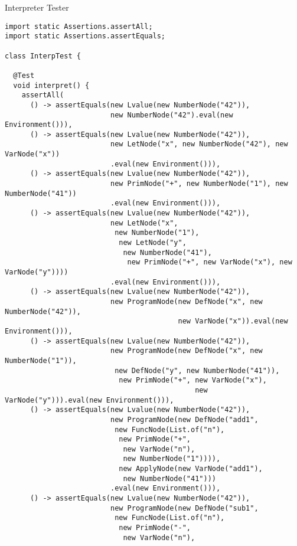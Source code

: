 \begin{cl}{Interpreter Tester}
\begin{lstlisting}[language=MyJava]
import static Assertions.assertAll;
import static Assertions.assertEquals;
  
class InterpTest {
  
  @Test
  void interpret() {
    assertAll(
      () -> assertEquals(new Lvalue(new NumberNode("42")),
                         new NumberNode("42").eval(new Environment())),
      () -> assertEquals(new Lvalue(new NumberNode("42")),
                         new LetNode("x", new NumberNode("42"), new VarNode("x"))
                         .eval(new Environment())),
      () -> assertEquals(new Lvalue(new NumberNode("42")),
                         new PrimNode("+", new NumberNode("1"), new NumberNode("41"))
                         .eval(new Environment())),
      () -> assertEquals(new Lvalue(new NumberNode("42")),
                         new LetNode("x",
                          new NumberNode("1"),
                           new LetNode("y",
                            new NumberNode("41"),
                             new PrimNode("+", new VarNode("x"), new VarNode("y"))))
                         .eval(new Environment())),
      () -> assertEquals(new Lvalue(new NumberNode("42")),
                         new ProgramNode(new DefNode("x", new NumberNode("42")),
                                         new VarNode("x")).eval(new Environment())),
      () -> assertEquals(new Lvalue(new NumberNode("42")),
                         new ProgramNode(new DefNode("x", new NumberNode("1")),
                          new DefNode("y", new NumberNode("41")),
                           new PrimNode("+", new VarNode("x"),
                                             new VarNode("y"))).eval(new Environment())),
      () -> assertEquals(new Lvalue(new NumberNode("42")),
                         new ProgramNode(new DefNode("add1",
                          new FuncNode(List.of("n"),
                           new PrimNode("+",
                            new VarNode("n"),
                            new NumberNode("1")))),
                           new ApplyNode(new VarNode("add1"),
                            new NumberNode("41")))
                         .eval(new Environment())),
      () -> assertEquals(new Lvalue(new NumberNode("42")),
                         new ProgramNode(new DefNode("sub1",
                          new FuncNode(List.of("n"),
                           new PrimNode("-",
                            new VarNode("n"),

\end{lstlisting}
\end{cl}
